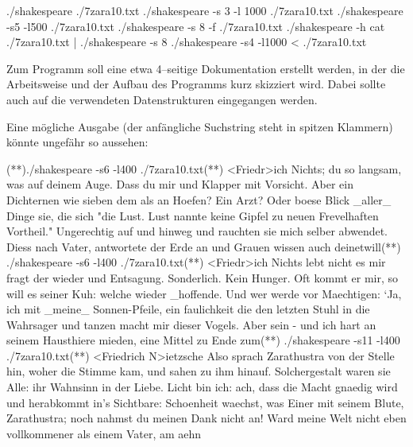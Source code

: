 \documentclass[paper=a4,notitlepage,parskip=half,plainheadsepline]{scrartcl}
\newcommand\bashprompt{\textcolor{red!25!white}{\small\ttfamily\bfseries bash\$> }}
\newcommand\noprompt{\hspace{0.6cm}}
\newcommand{\startBash}{\gdef\myprompt{\bashprompt}}
\newcommand{\startNone}{\gdef\myprompt{\noprompt}}
\begin{document}
\startBash
\begin{commandshell}
./shakespeare ./7zara10.txt                     
./shakespeare -s 3 -l 1000 ./7zara10.txt                
./shakespeare -s5 -l500 ./7zara10.txt                   
./shakespeare -s 8 -f ./7zara10.txt         
./shakespeare  -h                           
cat ./7zara10.txt | ./shakespeare -s 8   
./shakespeare -s4 -l1000 < ./7zara10.txt     
\end{commandshell}

Zum Programm soll eine etwa 4--seitige Dokumentation erstellt werden, in der die Arbeitsweise und der Aufbau des Programms kurz skizziert wird. Dabei sollte auch auf die verwendeten Datenstrukturen eingegangen werden.

Eine mögliche Ausgabe (der anfängliche Suchstring steht in spitzen Klammern) könnte ungefähr so aussehen:

\begin{commandshell}
(*\startBash*)./shakespeare -s6 -l400 ./7zara10.txt(*\startNone*)
<Friedr>ich Nichts; du so langsam, was auf deinem Auge. Dass du mir und Klapper mit Vorsicht. Aber ein Dichternen wie sieben dem als an Hoefen? Ein Arzt? Oder boese Blick _aller_ Dinge sie, die sich "die Lust. Lust nannte keine Gipfel zu neuen Frevelhaften Vortheil." Ungerechtig auf und hinweg und rauchten sie mich selber abwendet. Diess nach Vater, antwortete der Erde an und Grauen wissen auch deinetwill(*\startBash*)
./shakespeare -s6 -l400 ./7zara10.txt(*\startNone*)
<Friedr>ich Nichts lebt nicht es mir fragt der wieder und Entsagung. Sonderlich. Kein Hunger. Oft kommt er mir, so will es seiner Kuh: welche wieder _hoffende. Und wer werde vor Maechtigen: `Ja, ich mit _meine_ Sonnen-Pfeile, ein faulichkeit die den letzten Stuhl in die Wahrsager und tanzen macht mir dieser Vogels. Aber sein - und ich hart an seinem Hausthiere mieden, eine Mittel zu Ende zum(*\startBash*)
./shakespeare -s11 -l400 ./7zara10.txt(*\startNone*)
<Friedrich N>ietzsche
Also sprach Zarathustra von der Stelle hin, woher die Stimme kam, und sahen zu ihm hinauf. Solchergestalt waren sie Alle: ihr Wahnsinn in der Liebe.
Licht bin ich: ach, dass die Macht gnaedig wird und herabkommt in's Sichtbare: Schoenheit waechst, was Einer mit seinem Blute, Zarathustra; noch nahmst du meinen Dank nicht an! Ward meine Welt nicht eben vollkommener als einem Vater, am aehn    
\end{commandshell}
\end{document}
